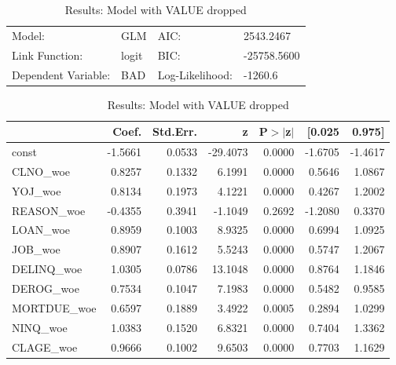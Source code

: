 \begin{appendices}
\begin{table}[H]
\renewcommand{\arraystretch}{1.25}
\begin{center}
\begin{tabular}{llll}
\hline
Model:              & GLM              & AIC:            & 2543.2467    \\
Link Function:      & logit            & BIC:            & -25758.5600  \\
Dependent Variable: & BAD              & Log-Likelihood: & -1260.6      \\
\hline
\end{tabular}
\end{center}
\begin{center}
\begin{tabular}{lrrrrrr}
\hline
             &  Coef.  & Std.Err. &    z     & P$> |$z$|$ &  [0.025 &  0.975]  \\
\hline
\hline
const        & -1.5661 &   0.0533 & -29.4073 &      0.0000 & -1.6705 & -1.4617  \\
CLNO\_woe    &  0.8257 &   0.1332 &   6.1991 &      0.0000 &  0.5646 &  1.0867  \\
YOJ\_woe     &  0.8134 &   0.1973 &   4.1221 &      0.0000 &  0.4267 &  1.2002  \\
REASON\_woe  & -0.4355 &   0.3941 &  -1.1049 &      0.2692 & -1.2080 &  0.3370  \\
LOAN\_woe    &  0.8959 &   0.1003 &   8.9325 &      0.0000 &  0.6994 &  1.0925  \\
JOB\_woe     &  0.8907 &   0.1612 &   5.5243 &      0.0000 &  0.5747 &  1.2067  \\
DELINQ\_woe  &  1.0305 &   0.0786 &  13.1048 &      0.0000 &  0.8764 &  1.1846  \\
DEROG\_woe   &  0.7534 &   0.1047 &   7.1983 &      0.0000 &  0.5482 &  0.9585  \\
MORTDUE\_woe &  0.6597 &   0.1889 &   3.4922 &      0.0005 &  0.2894 &  1.0299  \\
NINQ\_woe    &  1.0383 &   0.1520 &   6.8321 &      0.0000 &  0.7404 &  1.3362  \\
CLAGE\_woe   &  0.9666 &   0.1002 &   9.6503 &      0.0000 &  0.7703 &  1.1629  \\
\hline
\end{tabular}
\end{center}
\caption{Results: Model with VALUE dropped \label{table:results_val_dropped}}
\end{table}


\end{appendices}

